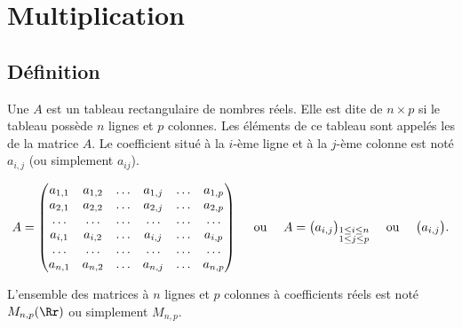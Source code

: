 \documentclass[11pt,class=report,crop=false]{standalone}
\begin{document}







\section{Multiplication}


\subsection{Définition}

Une  $A$ est un tableau rectangulaire
de nombres réels. 
Elle est dite de  $n \times p$ si le tableau possède $n$ lignes et $p$ colonnes.
Les éléments de ce tableau sont appelés les  de la matrice $A$.
Le coefficient situé à  la $i$-ème ligne et à la $j$-ème colonne est noté $a_{i,j}$ (ou simplement $a_{ij}$).


$$A=\begin{pmatrix}
	a_{1,1}& a_{1,2}& \dots & a_{1,j}& \dots & a_{1,p}\cr
	a_{2,1}& a_{2,2}& \dots & a_{2,j}& \dots &a_{2,p}\cr
	\dots & \dots & \dots & \dots & \dots & \dots \cr
	a_{i,1}& a_{i,2} & \dots & a_{i,j}& \dots &a_{i,p} \cr
	\dots & \dots & \dots & \dots & \dots & \dots \cr
	a_{n,1}& a_{n,2}& \dots & a_{n,j}& \dots & a_{n,p}\cr
\end{pmatrix}
\quad \text{ ou } \quad
A= \big(a_{i,j}\big)_{\substack{1\leq i \leq n \\ 1\leq j \leq p}}
\quad \text{ ou } \quad
\big(a_{i,j}\big).
$$

L'ensemble des matrices à $n$ lignes et $p$ colonnes à
coefficients réels est noté $M_{n,p}(\Rr)$ ou simplement $M_{n,p}$.
\end{document}

